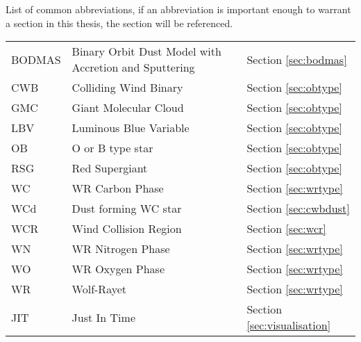 \begin{abbreviations}
List of common abbreviations, if an abbreviation is important enough to warrant a section in this thesis, the section will be referenced.

\begin{table}[h]
  \centering
  \begin{tabular}{l|l|l}
    
    \hline

    BODMAS & Binary Orbit Dust Model with Accretion and Sputtering & Section \ref{sec:bodmas} \\
    CWB & Colliding Wind Binary  & Section \ref{sec:obtype} \\
    GMC & Giant Molecular Cloud & Section \ref{sec:obtype}\\
    LBV & Luminous Blue Variable & Section \ref{sec:obtype} \\
    OB  & O or B type star & Section \ref{sec:obtype} \\ 
    RSG & Red Supergiant & Section \ref{sec:obtype} \\
    WC  & WR Carbon Phase & Section \ref{sec:wrtype} \\
    WCd & Dust forming WC star & Section \ref{sec:cwbdust} \\
    WCR & Wind Collision Region & Section \ref{sec:wcr} \\
    WN  & WR Nitrogen Phase & Section \ref{sec:wrtype} \\
    WO  & WR Oxygen Phase & Section \ref{sec:wrtype} \\
    WR  & Wolf-Rayet & Section \ref{sec:wrtype} \\

    \hline

    JIT & Just In Time & Section \ref{sec:visualisation} \\

  \end{tabular} 
  \label{tbl:Abbreviations}
\end{table}



\end{abbreviations}
